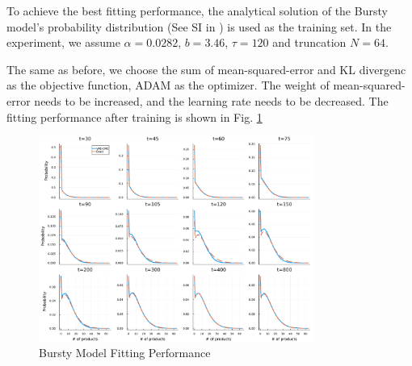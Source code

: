\documentclass[a4paper,10pt]{article}
\begin{document}
To achieve the best fitting performance, the analytical solution of the Bursty model's probability distribution (See SI in \cite{jiang2021neural}) is used as the training set. In the experiment, we assume $\alpha=0.0282$, $b=3.46$, $\tau=120$ and truncation $N=64$.

The same as before, we choose the sum of mean-squared-error and KL divergenc as the  objective  function, ADAM as the optimizer. The weight of mean-squared-error needs to be increased, and the learning rate needs to be decreased. The fitting performance after training is shown in Fig. \ref{Bursty Model Fitting}
\begin{figure}[h]
	\centering
	\includegraphics[width=0.8\textwidth]{Figs/Bursty_fitting.pdf}
	\caption{Bursty Model Fitting Performance}\label{Bursty Model Fitting}  
\end{figure}
\newpage
\end{document}
